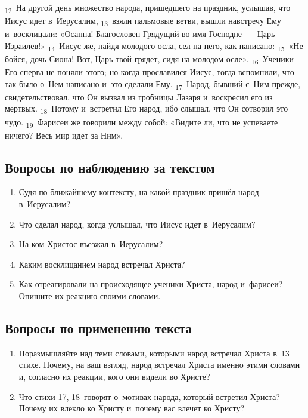 \documentclass[a4paper,12pt]{article}
\begin{document}
\textsubscript{12}~На другой день множество народа, пришедшего на праздник, услышав, что Иисус идет в~Иерусалим, \textsubscript{13}~взяли пальмовые ветви, вышли навстречу Ему и~восклицали: «Осанна! Благословен Грядущий во имя Господне~--- Царь Израилев!» \textsubscript{14}~Иисус же, найдя молодого осла, сел на него, как написано: \textsubscript{15}~«Не бойся, дочь Сиона! Вот, Царь твой грядет, сидя на молодом осле». \textsubscript{16}~Ученики Его сперва не поняли этого; но когда прославился Иисус, тогда вспомнили, что так было о~Нем написано и~это сделали Ему. \textsubscript{17}~Народ, бывший с~Ним прежде, свидетельствовал, что Он вызвал из гробницы Лазаря и~воскресил его из мертвых. \textsubscript{18}~Потому и~встретил Его народ, ибо слышал, что Он сотворил это чудо. \textsubscript{19}~Фарисеи же говорили между собой: «Видите ли, что не успеваете ничего? Весь мир идет за Ним».

\subsection*{Вопросы по наблюдению за текстом}
\begin{enumerate}
    \item Судя по ближайшему контексту, на какой праздник пришёл народ в~Иерусалим? 
    
    \myline
    
    \myline
    \item Что сделал народ, когда услышал, что Иисус идет в~Иерусалим? 
    
    \myline
    
    \myline
    \item На ком Христос въезжал в~Иерусалим? 
    
    \myline
    \item Каким восклицанием народ встречал Христа? 
    
    \myline
    
    \item Как отреагировали на происходящее ученики Христа, народ и~фарисеи? Опишите их реакцию своими словами. 
    
    \myline
    
    \myline
\end{enumerate}

\subsection*{Вопросы по применению текста} 
\begin{enumerate}
    \item Поразмышляйте над теми словами, которыми народ встречал Христа в~13 стихе. Почему, на ваш взгляд, народ встречал Христа именно этими словами и, согласно их реакции, кого они видели во Христе? 
    
    \myline
    
    \myline
    \item Что стихи 17, 18~говорят о~мотивах народа, который встретил Христа? Почему их влекло ко Христу и~почему вас влечет ко Христу? 
    
    \myline
    
    \myline
\end{enumerate}
\end{document}
